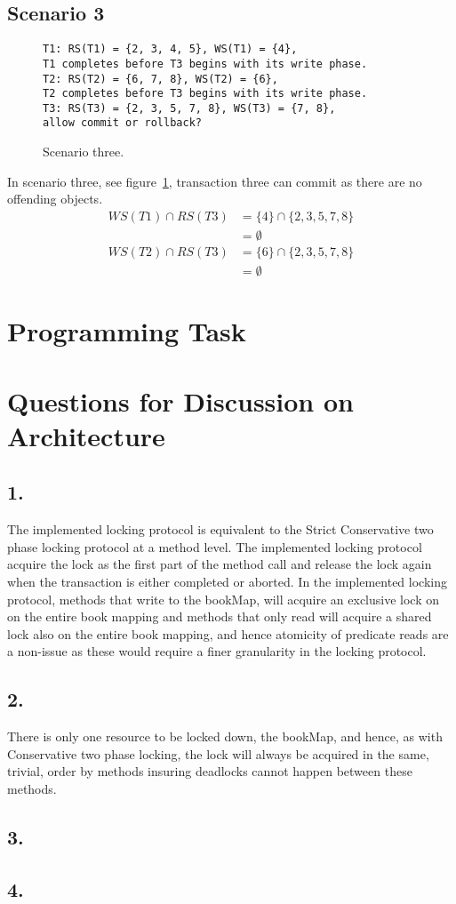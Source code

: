 \documentclass[12pt]{article}
\begin{document}
\subsection*{Scenario 3}
\begin{figure}[h!]
\texttt{T1: RS(T1) = \{2, 3, 4, 5\}, WS(T1) = \{4\},\\
T1 completes before T3 begins with its write phase.\\
T2: RS(T2) = \{6, 7, 8\}, WS(T2) = \{6\},\\
T2 completes before T3 begins with its write phase.\\
T3: RS(T3) = \{2, 3, 5, 7, 8\}, WS(T3) = \{7, 8\},\\
allow commit or rollback?}
\caption{Scenario three.}
\label{sc3}
\end{figure}
In scenario three, see figure~\ref{sc3}, transaction three can commit as there are no offending objects. 
\begin{align}
WS(T1) \cap RS(T3) &= \{4\} \cap \{2, 3, 5, 7, 8\}\\
&= \emptyset\\
WS(T2) \cap RS(T3) &= \{6\} \cap \{2, 3, 5, 7, 8\}\\
&= \emptyset
\end{align}
\section*{Programming Task}
\section*{Questions for Discussion on Architecture} %
\subsection*{1.} %
The implemented locking protocol is equivalent to the Strict Conservative two phase locking protocol at a method level. The implemented locking protocol acquire the lock as the first part of the method call and release the lock again when the transaction is either completed or aborted. In the implemented locking protocol, methods that write to the bookMap, will acquire an exclusive lock on on the entire book mapping and methods that only read will acquire a shared lock also on the entire book mapping, and hence atomicity of predicate reads are a non-issue as these would require a finer granularity in the locking protocol.
\subsection*{2.} %
There is only one resource to be locked down, the bookMap, and hence, as with Conservative two phase locking, the lock will always be acquired in the same, trivial, order by methods insuring deadlocks cannot happen between these methods.
\subsection*{3.} %

\subsection*{4.} %
\end{document}
